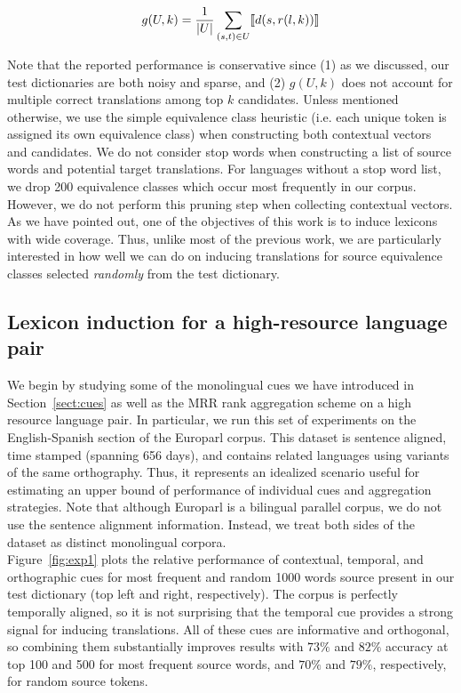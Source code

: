 \documentclass{article}
\newcommand{\secref}[1]{Section~\ref{#1}}
\newcommand{\figref}[1]{Figure~\ref{#1}}
\begin{document}
\begin{equation*}
  g(U, k) = {1 \over |U|}\sum_{(s,t) \in U} \llbracket d(s, r(l, k))\rrbracket
\end{equation*}

Note that the reported performance is conservative since (1) as we discussed, our test dictionaries are both noisy and sparse, and (2) $g(U, k)$ does not account for multiple correct translations among top $k$ candidates. Unless mentioned otherwise, we use the simple equivalence class heuristic (i.e. each unique token is assigned its own equivalence class) when constructing both contextual vectors and candidates.  We do not consider stop words when constructing a list of source words and potential target translations.  For languages without a stop word list, we drop 200 equivalence classes which occur most frequently in our corpus.  However, we do not perform this pruning step when collecting contextual vectors. \\

As we have pointed out, one of the objectives of this work is to induce lexicons with wide coverage.  Thus, unlike most of the previous work, we are particularly interested in how well we can do on inducing translations for source equivalence classes selected \emph{randomly} from the test dictionary.

\subsection{Lexicon induction for a high-resource language pair} \label{sect:exphigh}

We begin by studying some of the monolingual cues we have introduced in \secref{sect:cues} as well as the MRR rank aggregation scheme on a high resource language pair.  In particular, we run this set of experiments on the English-Spanish section of the Europarl corpus.  This dataset is sentence aligned,  time stamped (spanning 656 days), and contains related languages using variants of the same orthography.  Thus, it represents an idealized scenario useful for estimating an upper bound of performance of individual cues and aggregation strategies.  Note that although Europarl is a bilingual parallel corpus, we do not use the sentence alignment information. Instead, we treat both sides of the dataset as distinct monolingual corpora.\\

\figref{fig:exp1} plots the relative performance of contextual, temporal, and orthographic cues for most frequent and random 1000 words source present in our test dictionary (top left and right, respectively).  The corpus is perfectly temporally aligned, so it is not surprising that the temporal cue provides a strong signal for inducing translations.  All of these cues are informative and orthogonal, so combining them substantially improves results with $73\%$ and  $82\%$ accuracy at top 100 and 500 for most frequent source words, and $70\%$ and  $79\%$, respectively, for random source tokens.  \\
\end{document}
